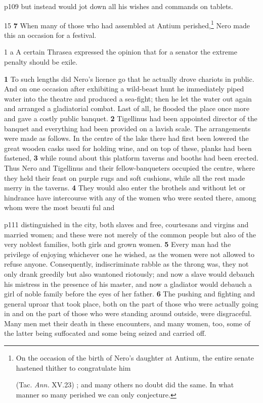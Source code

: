 p109 but instead would jot down all his wishes and commands on tablets.

15
\textbf{7} When many of those who had assembled at Antium perished,\texthebrew{⁠}\footnote{On the occasion of the birth of Nero's daughter at Antium, the entire senate hastened thither to congratulate him

(Tac. \emph{Ann.} XV.23) ; and many others no doubt did the same. In what manner so many perished we can only conjecture.

} Nero made this an occasion for a festival.

1 a A certain Thrasea expressed the opinion that for a senator the extreme penalty should be exile.

\textbf{1} To such lengths did Nero's licence go that he actually drove chariots in public. And on one occasion after exhibiting a wild-beast hunt he immediately piped water into the theatre and produced a sea-fight; then he let the water out again and arranged a gladiatorial combat. Last of all, he flooded the place once more and gave a costly public banquet. \textbf{2} Tigellinus had been appointed director of the banquet and everything had been provided on a lavish scale. The arrangements were made as follows. In the centre of the lake there had first been lowered the great wooden casks used for holding wine, and on top of these, planks had been fastened, \textbf{3} while round about this platform taverns and booths had been erected. Thus Nero and Tigellinus and their fellow-banqueters occupied the centre, where they held their feast on purple rugs and soft cushions, while all the rest made merry in the taverns. \textbf{4} They would also enter the brothels and without let or hindrance have intercourse with any of the women who were seated there, among whom were the most beauti ­ful and

p111 distinguished in the city, both slaves and free, courtesans and virgins and married women; and these were not merely of the common people but also of the very noblest families, both girls and grown women. \textbf{5} Every man had the privilege of enjoying whichever one he wished, as the women were not allowed to refuse anyone. Consequently, indiscriminate rabble as the throng was, they not only drank greedily but also wantoned riotously; and now a slave would debauch his mistress in the presence of his master, and now a gladiator would debauch a girl of noble family before the eyes of her father. \textbf{6} The pushing and fighting and general uproar that took place, both on the part of those who were actually going in and on the part of those who were standing around outside, were disgraceful. Many men met their death in these encounters, and many women, too, some of the latter being suffocated and some being seized and carried off.

